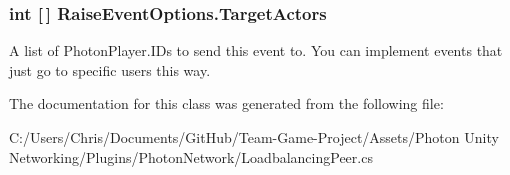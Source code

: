 \subsubsection[{\texorpdfstring{Target\+Actors}{TargetActors}}]{\setlength{\rightskip}{0pt plus 5cm}int \mbox{[}$\,$\mbox{]} Raise\+Event\+Options.\+Target\+Actors}\hypertarget{class_raise_event_options_a2efd7020aa43343d1f07a3f8227deb6a}{}\label{class_raise_event_options_a2efd7020aa43343d1f07a3f8227deb6a}


A list of Photon\+Player.\+I\+Ds to send this event to. You can implement events that just go to specific users this way.



The documentation for this class was generated from the following file\+:\begin{DoxyCompactItemize}
\item 
C\+:/\+Users/\+Chris/\+Documents/\+Git\+Hub/\+Team-\/\+Game-\/\+Project/\+Assets/\+Photon Unity Networking/\+Plugins/\+Photon\+Network/Loadbalancing\+Peer.\+cs\end{DoxyCompactItemize}
